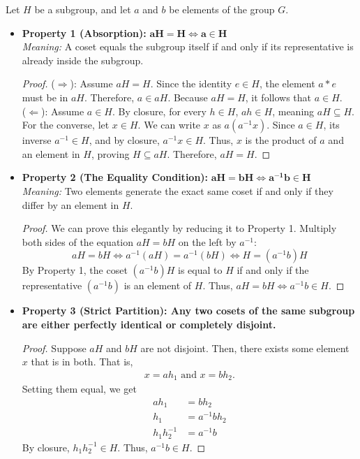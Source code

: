 \documentclass[12pt]{article}
\begin{document}
Let $H$ be a subgroup, and let $a$ and $b$ be elements of the group $G$.
\begin{itemize}
    \item \textbf{Property 1 (Absorption):} $\mathbf{aH = H \iff a \in H}$ \\
          \textit{Meaning:} A coset equals the subgroup itself if and only if its representative is already inside the subgroup.
          \begin{proof}
              ($\Rightarrow$): Assume $aH = H$. Since the identity $e \in H$, the element $a*e$ must be in $aH$. Therefore, $a \in aH$. Because $aH = H$, it follows that $a \in H$. \\
              ($\Leftarrow$): Assume $a \in H$.
              By closure, for every $h \in H$, $ah \in H$, meaning $aH \subseteq H$. For the converse, let $x \in H$. We can write $x$ as $a(a^{-1}x)$. Since $a \in H$, its inverse $a^{-1} \in H$, and by closure, $a^{-1}x \in H$. Thus, $x$ is the product of $a$ and an element in $H$, proving $H \subseteq aH$. Therefore, $aH = H$.
          \end{proof}

    \item \textbf{Property 2 (The Equality Condition):} $\mathbf{aH = bH \iff a^{-1}b \in H}$ \\
          \textit{Meaning:} Two elements generate the exact same coset if and only if they differ by an element in $H$.
          \begin{proof}
              We can prove this elegantly by reducing it to Property 1.
              Multiply both sides of the equation $aH = bH$ on the left by $a^{-1}$:
              $$ aH = bH \iff a^{-1}(aH) = a^{-1}(bH) \iff H = (a^{-1}b)H $$
              By Property 1, the coset $(a^{-1}b)H$ is equal to $H$ if and only if the representative $(a^{-1}b)$ is an element of $H$. Thus, $aH = bH \iff a^{-1}b \in H$.
          \end{proof}

    \item \textbf{Property 3 (Strict Partition): Any two cosets of the same subgroup are either perfectly identical or completely disjoint.}
          \begin{proof}
              Suppose $aH$ and $bH$ are not disjoint.
              Then, there exists some element $x$ that is in both.
              That is,
              \begin{align*}
                  x = ah_1 \text{ and } x = bh_2.
              \end{align*}
              Setting them equal, we get
              \begin{align*}
                  ah_1        & = bh_2       \\
                  h_1         & = a^{-1}bh_2 \\
                  h_1h_2^{-1} & = a^{-1}b
              \end{align*}
              By closure, $h_1h_2^{-1} \in H$.
              Thus, $a^{-1}b \in H$.


\end{proof}
\end{itemize}
\end{document}
